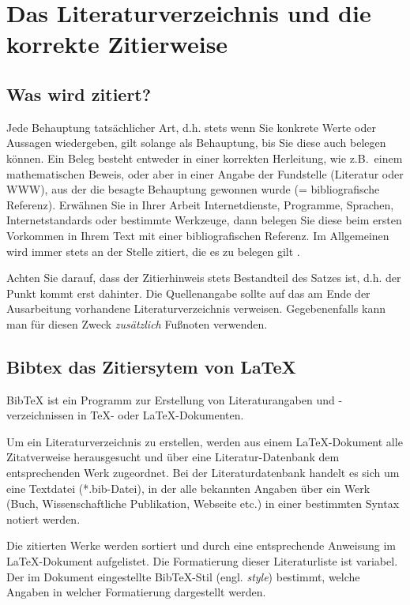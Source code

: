 %
\section{Das Literaturverzeichnis und die korrekte Zitierweise}
\label{sec_literatur}

\subsection{Was wird zitiert?}
Jede Behauptung tatsächlicher Art, d.h. stets wenn Sie konkrete Werte oder Aussagen wiedergeben, gilt solange als Behauptung, bis Sie diese auch belegen können.
Ein Beleg besteht entweder in einer korrekten Herleitung, wie z.B.~einem mathematischen Beweis, oder aber in einer Angabe der Fundstelle (Literatur oder WWW), aus der die besagte Behauptung gewonnen wurde (= bibliografische Referenz). 
Erwähnen Sie in Ihrer Arbeit Internetdienste, Programme, Sprachen, Internetstandards oder bestimmte Werkzeuge, dann belegen Sie diese beim ersten Vorkommen in Ihrem Text mit einer bibliografischen Referenz.
Im Allgemeinen wird immer stets an der Stelle zitiert, die es zu belegen gilt \cite{Marchionini}.

Achten Sie darauf, dass der Zitierhinweis stets Bestandteil des Satzes ist, d.h. der Punkt kommt erst dahinter.
Die Quellenangabe sollte auf das am Ende der Ausarbeitung vorhandene Literaturverzeichnis verweisen. 
Gegebenenfalls kann man für diesen Zweck {\em zusätzlich} Fußnoten verwenden.

\subsection{Bibtex das Zitiersytem von \LaTeX}

BibTeX ist ein Programm zur Erstellung von Literaturangaben und -verzeichnissen in TeX- oder \LaTeX-Dokumenten.

Um ein Literaturverzeichnis zu erstellen, werden aus einem \LaTeX-Dokument alle Zitatverweise herausgesucht und über eine Literatur-Datenbank dem entsprechenden Werk zugeordnet. Bei der Literaturdatenbank handelt es sich um eine Textdatei (*.bib-Datei), in der alle bekannten Angaben über ein Werk (Buch, Wissenschaftliche Publikation, Webseite  etc.) in einer bestimmten Syntax notiert werden.

Die zitierten Werke werden sortiert und durch eine entsprechende Anweisung im LaTeX-Dokument aufgelistet. Die Formatierung dieser Literaturliste ist variabel. Der im Dokument eingestellte BibTeX-Stil (engl. {\em style}) bestimmt, welche Angaben in welcher Formatierung dargestellt werden.

